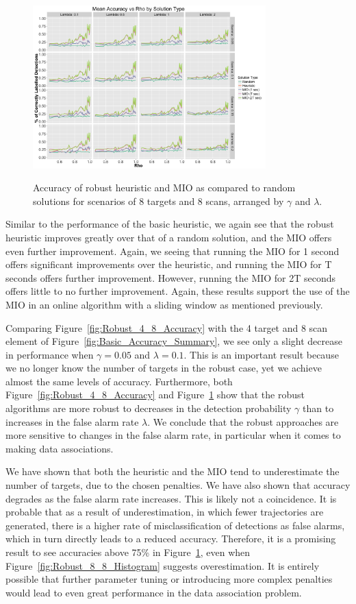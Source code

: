 \documentclass[journal]{IEEEtran}
\begin{document}
\begin{figure}[h]
  \centering
  \includegraphics[width=9cm, height=7cm]{8_8_Accuracy}
  \caption{Accuracy of robust heuristic and MIO as compared to random solutions for scenarios of 8 targets and 8 scans, arranged by $\gamma$ and $\lambda$.}
  \label{fig:Robust_8_8_Accuracy}
\end{figure}

Similar to the performance of the basic heuristic, we again see that the robust heuristic improves greatly over that of a random solution, and the MIO offers even further improvement. Again, we seeing that running the MIO for 1 second offers significant improvements over the heuristic, and running the MIO for T seconds offers further improvement. However, running the MIO for 2T seconds offers little to no further improvement. Again, these results support the use of the MIO in an online algorithm with a sliding window as mentioned previously. 

Comparing Figure~\ref{fig:Robust_4_8_Accuracy} with the 4 target and 8 scan element of Figure~\ref{fig:Basic_Accuracy_Summary}, we see only a slight decrease in performance when $\gamma = 0.05$ and $\lambda=0.1$. This is an important result because we no longer know the number of targets in the robust case, yet we achieve almost the same levels of accuracy. Furthermore, both Figure~\ref{fig:Robust_4_8_Accuracy} and Figure~\ref{fig:Robust_8_8_Accuracy} show that the robust algorithms are more robust to decreases in the detection probability $\gamma$ than to increases in the false alarm rate $\lambda$. We conclude that the robust approaches are more sensitive to changes in the false alarm rate, in particular when it comes to making data associations. 

We have shown that both the heuristic and the MIO tend to underestimate the number of targets, due to the chosen penalties. We have also shown that accuracy degrades as the false alarm rate increases. This is likely not a coincidence. It is probable that as a result of underestimation, in which fewer trajectories are generated, there is a higher rate of misclassification of detections as false alarms, which in turn directly leads to a reduced accuracy. Therefore, it is a promising result to see accuracies above 75\% in Figure~\ref{fig:Robust_8_8_Accuracy}, even when Figure~\ref{fig:Robust_8_8_Histogram} suggests overestimation. It is entirely possible that further parameter tuning or introducing more complex penalties would lead to even great performance in the data association problem.
\end{document}

